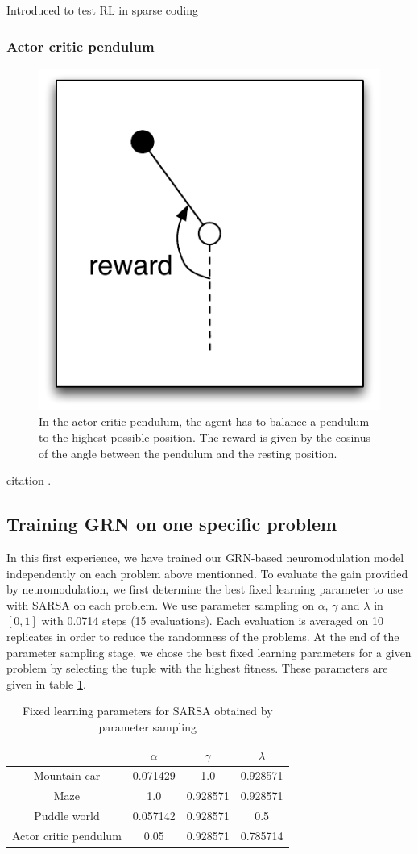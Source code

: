 Introduced to test RL in sparse coding \cite{sutton1996generalization}

\subsubsection{Actor critic pendulum}
\begin{figure}
\center
\includegraphics[width=0.5\linewidth]{ACP_problem.pdf}
\caption{In the actor critic pendulum, the agent has to balance a pendulum to the highest possible position. The reward is given by the cosinus of the angle between the pendulum and the resting position.}\label{fig:MC:problem}
\end{figure}


citation \cite{sutton1998introduction}. 

\subsection{Training GRN on one specific problem}
In this first experience, we have trained our GRN-based neuromodulation model independently on each problem above mentionned. To evaluate the gain provided by neuromodulation, we first determine the best fixed learning parameter to use with SARSA on each problem. We use parameter sampling on $\alpha$, $\gamma$ and $\lambda$ in $[0, 1]$ with 0.0714 steps (15 evaluations). Each evaluation is averaged on 10 replicates in order to reduce the randomness of the problems. At the end of the parameter sampling stage, we chose the best fixed learning parameters for a given problem by selecting the tuple with the highest fitness. These parameters are given in table \ref{tab:SARSAFixedParams}.

\begin{table}
\begin{tabular}{c|ccc}
					& $\alpha$	& $\gamma$	& $\lambda$	\\\hline
Mountain car			& 0.071429	& 1.0		& 0.928571 	\\%
Maze				& 1.0		& 0.928571	& 0.928571	\\%
Puddle world			&  0.057142	& 0.928571	& 0.5		\\%
Actor critic pendulum	& 0.05		& 0.928571	& 0.785714	\\%
\end{tabular}
\caption{Fixed learning parameters for SARSA obtained by parameter sampling}\label{tab:SARSAFixedParams}
\end{table}

